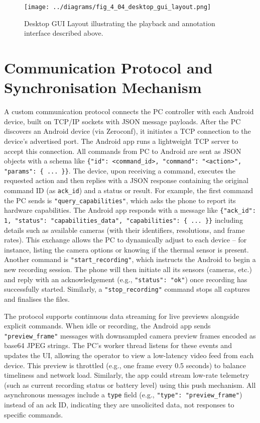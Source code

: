 \begin{figure}[htbp]
    \centring
    \texttt{[image: ../diagrams/fig\_4\_04\_desktop\_gui\_layout.png]}
    \caption{Desktop GUI Layout illustrating the playback and annotation interface described above.}
    \label{fig:4_04_desktop_gui_layout}
\end{figure}


\section{Communication Protocol and Synchronisation Mechanism}\label{sec:4-4}
A custom communication protocol connects the PC controller with each Android device, built on TCP/IP sockets \cite{ref21} with JSON message payloads. After the PC discovers an Android device (via Zeroconf), it initiates a TCP connection to the device's advertised port. The Android app runs a lightweight TCP server to accept this connection. All commands from PC to Android are sent as JSON objects with a schema like \texttt{\{"id": <command\_id>, "command": "<action>", "params": \{ ... \}\}}. The device, upon receiving a command, executes the requested action and then replies with a JSON response containing the original command ID (as \texttt{ack\_id}) and a status or result. For example, the first command the PC sends is \texttt{"query\_capabilities"}, which asks the phone to report its hardware capabilities. The Android app responds with a message like \texttt{\{"ack\_id": 1, "status": "capabilities\_data", "capabilities": \{ ... \}\}} including details such as available cameras (with their identifiers, resolutions, and frame rates). This exchange allows the PC to dynamically adjust to each device -- for instance, listing the camera options or knowing if the thermal sensor is present. Another command is \texttt{"start\_recording"}, which instructs the Android to begin a new recording session. The phone will then initiate all its sensors (cameras, etc.) and reply with an acknowledgement (e.g., \texttt{"status": "ok"}) once recording has successfully started. Similarly, a \texttt{"stop\_recording"} command stops all captures and finalises the files.

The protocol supports continuous data streaming for live previews alongside explicit commands. When idle or recording, the Android app sends \texttt{"preview\_frame"} messages with downsampled camera preview frames encoded as base64 JPEG strings. The PC's worker thread listens for these events and updates the UI, allowing the operator to view a low-latency video feed from each device. This preview is throttled (e.g., one frame every 0.5 seconds) to balance timeliness and network load. Similarly, the app could stream low-rate telemetry (such as current recording status or battery level) using this push mechanism. All asynchronous messages include a \texttt{type} field (e.g., \texttt{"type": "preview\_frame"}) instead of an ack ID, indicating they are unsolicited data, not responses to specific commands.

